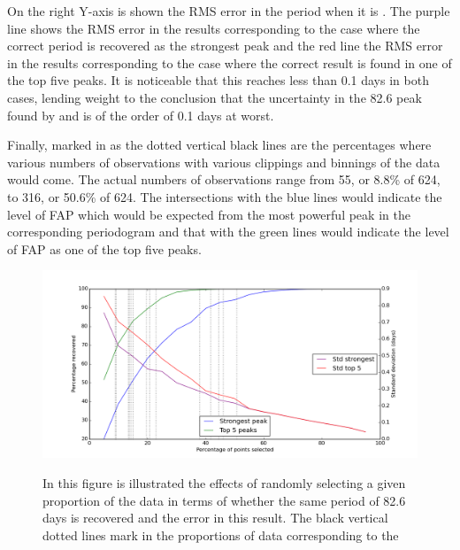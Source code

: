 On the right Y-axis is shown the RMS error in the period when it is . The purple line
shows the RMS error in the results corresponding to the case where the correct period is recovered as the strongest peak
and the red line the RMS error in the results corresponding to the case where the correct result is found in one of the
top five peaks. It is noticeable that this reaches less than 0.1 days in both cases, lending weight to the conclusion
that the uncertainty in the 82.6 peak found by {\asas} and {\hst} is of the order of 0.1 days at worst.

Finally, marked in as the dotted vertical black lines are the percentages where various numbers of observations with
various clippings and binnings of the {\harps} data would come. The actual numbers of observations range from 55, or
8.8\% of 624, to 316, or 50.6\% of 624. The intersections with the blue lines would indicate the level of FAP which
would be expected from the most powerful peak in the corresponding periodogram and that with the green lines would
indicate the level of FAP as one of the top five peaks.

\begin{figure}[!htbp]
\begin{center}
\includegraphics[scale=0.5]{Figures/prop.png} \\
\end{center}   
\caption{In this figure is illustrated the effects of randomly selecting a given proportion of the {\asas} data in terms
  of whether the same period of 82.6 days is recovered and the error in this result. The black vertical dotted lines
  mark in the proportions of data corresponding to the }
\protect\label{fig:asasprop}
\end{figure}

